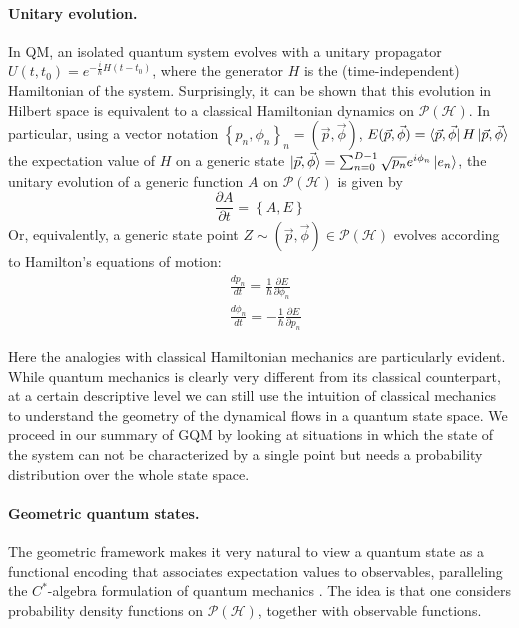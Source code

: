\documentclass[draft,nofootinbib,pre,twocolumn,showpacs,showkeys,preprintnumbers,floatfix]{revtex4-1}
\newcommand{\1}{\mathbbm{1}}
\newcommand{\PH}{\mathcal{P}(\mathcal{H})}
\begin{document}
\paragraph*{Unitary evolution.} In QM, an isolated quantum system evolves
with a unitary propagator $U(t,t_0) = e^{-\frac{i}{\hbar}H (t-t_0)}$, where the
generator $H$ is the (time-independent) Hamiltonian of the system. Surprisingly, 
it can be shown \cite{Bengtsson2017} that this evolution in Hilbert space is equivalent to 
a classical Hamiltonian dynamics on $\PH$. In particular, using a vector notation $\left\{ p_n,\phi_n\right\}_n = (\vec{p},\vec{\phi})$, 
$E(\vec{p}, \vec{\phi}) = \bra{\vec{p},\vec{\phi}}H \ket{\vec{p},\vec{\phi}}$
the expectation value of $H$ on a generic state $\ket{\vec{p},\vec{\phi}} = \sum_{n=0}^{D-1}\sqrt{p_n}e^{i\phi_n}\ket{e_n}$, 
the unitary evolution of a generic function $A$ on $\PH$ is given by 
\begin{equation}
\frac{\partial A}{\partial t} = \left\{ A,E\right\}
\end{equation}
Or, equivalently, a generic state point $Z \sim (\vec{p},\vec{\phi}) \in \PH$
evolves according to Hamilton's equations of motion:
\begin{subequations}\label{eq:HAM_EOM}
\begin{align}
&\frac{dp_n}{dt} = \frac{1}{\hbar}\frac{\partial E}{\partial \phi_n} \\
&\frac{d\phi_n}{dt} = -\frac{1}{\hbar}\frac{\partial E}{\partial p_n} 
\end{align}
\end{subequations}

Here the analogies with classical Hamiltonian mechanics are particularly evident.
While quantum mechanics is clearly very different from its classical
counterpart, at a certain descriptive level we can still use the intuition
of classical mechanics to understand the geometry of the dynamical flows in a
quantum state space. We proceed in our summary of GQM by looking at situations 
in which the state of the system can not be characterized by a single point but needs 
a probability distribution over the whole state space.


\paragraph*{Geometric quantum states.}
The geometric framework makes it very natural to view a quantum state as a functional
encoding that associates expectation values to observables, paralleling the
$C^{*}$-algebra formulation of quantum mechanics \cite{Strocchi2008a}. 
The idea is that one considers probability density functions on $\mathcal{P}(\mathcal{H})$,
together with observable functions. 
\end{document}
